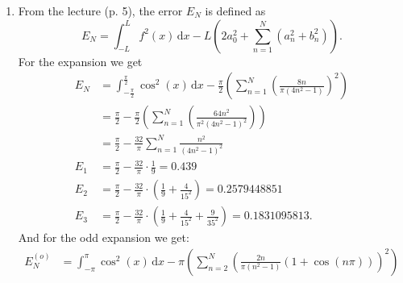 \begin{derivation}
\begin{enumerate}[label=\alph*)]
    We start by determining the Fourier coefficients $b_n$ as:
    \begin{align*}
      b_n &= \frac{2}{\pi} \int_{0}^{\pi} f(x) \sin \left( \frac{n \pi x}{\pi} \right) \\
      &= \frac{2}{\pi} \int_{0}^{\pi} \cos x \sin (nx) \, \mathrm{d}x \\
      &=  \frac{2n}{\pi (1 - n^2)} \left( \cos (n \pi) \cos (\pi) - 1 \right)
    .\end{align*}
    From the hints we know that this is 0 for $n = 1$, hence:
    \begin{equation*}
      f(x) = \sum_{n = 1}^{\infty} b_n \sin \left( \frac{n\pi x}{L} \right) = \sum_{n = 2}^{\infty} \frac{2n}{\pi \left( n^2 -1 \right)} (1 - \cos (n \pi)) \sin (n x)
    .\end{equation*}
  \item From the lecture (p. 5), the error $E_N$ is defined as
    \begin{equation*}
      E_N = \int_{-L}^{L} f^2(x) \, \mathrm{d}x - L \left( 2a_0^2 + \sum_{n = 1}^{N} \left( a_n^2 + b_n^2 \right) \right)
    .\end{equation*}
    For the expansion we get
    \begin{align*}
      E_N &= \int_{-\frac{\pi}{2}}^{\frac{\pi}{2}} \cos^2(x) \, \mathrm{d}x - \frac{\pi}{2} \left( \sum_{n = 1}^{N} \left( \frac{8n}{\pi \left( 4n^2 - 1 \right)} \right)^2 \right) \\
          &= \frac{\pi}{2} - \frac{\pi}{2} \left( \sum_{n = 1}^{N} \left( \frac{64n^2}{\pi^2 \left( 4n^2 - 1 \right)^2} \right) \right) \\
          &= \frac{\pi}{2} - \frac{32}{\pi} \sum_{n = 1}^{N} \frac{n^2}{\left( 4n^2 - 1 \right)^2} \\
      E_1 &= \frac{\pi}{2} - \frac{32}{\pi} \cdot \frac{1}{9} = \num{0,439} \\
      E_2 &= \frac{\pi}{2} - \frac{32}{\pi} \cdot \left( \frac{1}{9} + \frac{4}{15^2} \right) = \num{0,2579448851} \\
      E_3 &= \frac{\pi}{2} - \frac{32}{\pi} \cdot \left( \frac{1}{9} + \frac{4}{15^2} + \frac{9}{35^2} \right) = \num{0,1831095813} 
    .\end{align*}
    And for the odd expansion we get:
    \begin{align*}
      E_{N}^{(o)} &= \int_{-\pi}^{\pi} \cos^2(x) \, \mathrm{d}x - \pi \left( \sum_{n = 2}^{N}   \left( \frac{2n}{\pi \left( n^2 - 1 \right)} \left( 1 + \cos (n\pi) \right)\right)^2 \right) \\

\end{align*}
\end{enumerate}
\end{derivation}
